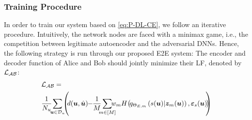 \documentclass[conference]{IEEEtran}
\begin{document}
	\subsubsection*{Training Procedure}\label{sec:training}
	In order to train our  system  based on   \eqref{eq:P-DL-CE}, we  follow an  iterative procedure.  
	Intuitively, the network nodes  are faced  with a  minimax game, i.e., the competition between legitimate autoencoder and the adversarial  DNNs.  
	Hence,  the following strategy is run  through our proposed E2E system:  	
		The encoder and decoder function of Alice and Bob should jointly minimize their LF, denoted by $\mathcal{L}_{\cal AB}$:  
        \begin{align}
        & \hspace{0.5mm}\mathcal{L}_{\cal AB}  =
         \nonumber \\
         &  \hspace{0.5mm} \frac{1}{N_{u}}\hspace{-1.5mm}\sum_{{\bm u} \in \mathcal{D}_u}
			\hspace{-1.5mm} \left( \hspace{-1mm}
			d(\bm u, \hat{\bm u})\hspace{-1mm}-
			\hspace{-1mm}\frac{1}{M} \hspace{-2mm}\sum_{m \in [M]} \hspace{-3mm} w_m \hspace{0mm}
		H\hspace{-0.5mm}\left(\hspace{-0.5mm}q_{\Theta_{E,m}}\left({s{(\bm u)}|{\bm z}_m{(\bm u)}}\right),{{\bm \varepsilon}_{s}}{(\bm u)} \hspace{-0.5mm} \right)\hspace{-1.9mm}
			\right)\label{eq:L_AB}
        \end{align}
\end{document}

